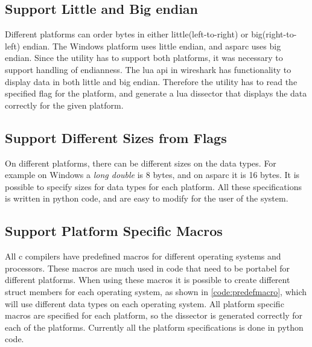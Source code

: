 \subsection{Support Little and Big \Gls{endian}}
Different platforms can order bytes in either little(left-to-right) or 
big(right-to-left) \gls{endian}. The \Gls{Windows} platform uses little \gls{endian}, and \gls{asparc} 
uses big \gls{endian}. Since the \gls{utility} has to support both platforms, it was 
necessary to support handling of \gls{endianness}. The \Gls{lua} \gls{api} in \Gls{wireshark} has 
functionality to display data in both little and big \gls{endian}. Therefore the 
\gls{utility} has to read the specified flag for the platform, and generate a \Gls{lua} 
\gls{dissector} that displays the data correctly for the given platform.

\subsection{Support Different Sizes from Flags}
On different platforms, there can be different sizes on the data types. For 
example on Windows a \emph{long double} is 8 bytes, and on \gls{asparc} it is 16 
bytes. It is possible to specify sizes for data types for each platform. All 
these specifications is written in \Gls{python} code, and are easy to modify for the 
user of the system.

\subsection{Support Platform Specific Macros}
All \Gls{c} compilers have predefined macros for different operating systems and 
processors. These macros are much used in code that need to be portabel for 
different platforms. When using these macros it is possible to create 
different \gls{struct} \glspl{member} for each operating system, as shown in 
\autoref{code:predefmacro}, which will use different data types on each 
operating system. All platform specific macros are specified for each 
platform, so the \gls{dissector} is generated correctly for each of the platforms. 
Currently all the platform specifications is done in \Gls{python} code.



